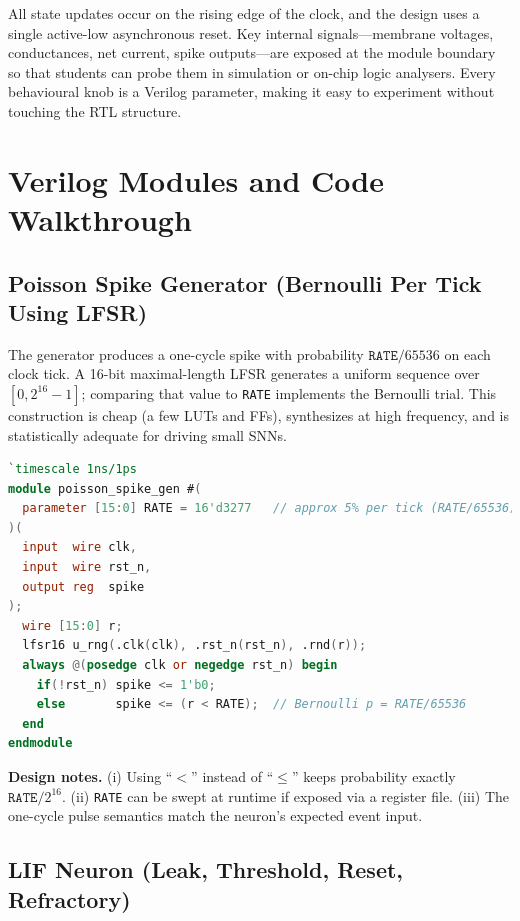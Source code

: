 \documentclass[10pt,onecolumn]{IEEEtran}
\begin{document}
All state updates occur on the rising edge of the clock, and the design uses a single active-low asynchronous reset. Key internal signals—membrane voltages, conductances, net current, spike outputs—are exposed at the module boundary so that students can probe them in simulation or on-chip logic analysers. Every behavioural knob is a Verilog parameter, making it easy to experiment without touching the RTL structure.


\section{Verilog Modules and Code Walkthrough}
\label{sec:modules}

\subsection{Poisson Spike Generator (Bernoulli Per Tick Using LFSR)}
\label{sec:poisson}

The generator produces a one-cycle spike with probability \(\texttt{RATE}/65536\) on each clock tick. A 16-bit maximal-length LFSR generates a uniform sequence over \([0, 2^{16}-1]\); comparing that value to \texttt{RATE} implements the Bernoulli trial. This construction is cheap (a few LUTs and FFs), synthesizes at high frequency, and is statistically adequate for driving small SNNs.

\begin{lstlisting}[language=Verilog,basicstyle=\ttfamily\small,caption={Poisson spike source using a 16-bit LFSR.},label={lst:poiss}]
`timescale 1ns/1ps
module poisson_spike_gen #(
  parameter [15:0] RATE = 16'd3277   // approx 5% per tick (RATE/65536)
)(
  input  wire clk,
  input  wire rst_n,
  output reg  spike
);
  wire [15:0] r;
  lfsr16 u_rng(.clk(clk), .rst_n(rst_n), .rnd(r));
  always @(posedge clk or negedge rst_n) begin
    if(!rst_n) spike <= 1'b0;
    else       spike <= (r < RATE);  // Bernoulli p = RATE/65536
  end
endmodule
\end{lstlisting}

\noindent
\textbf{Design notes.} (i) Using ``\(<\)'' instead of ``\(\le\)'' keeps probability exactly \(\texttt{RATE}/2^{16}\). (ii) \texttt{RATE} can be swept at runtime if exposed via a register file. (iii) The one-cycle pulse semantics match the neuron’s expected event input.


\subsection{LIF Neuron (Leak, Threshold, Reset, Refractory)}
\label{sec:lif-core}
\end{document}
